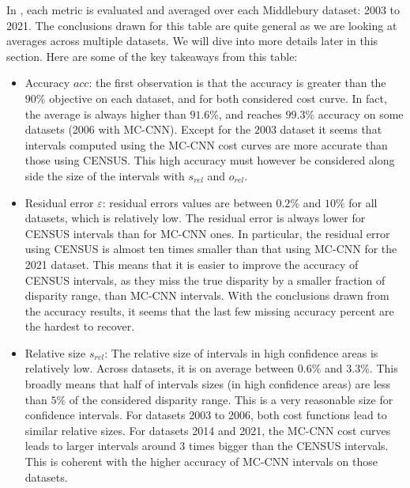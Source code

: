 In , each metric is evaluated and averaged over each Middlebury dataset: 2003 to 2021. The conclusions drawn for this table are quite general as we are looking at averages across multiple datasets. We will dive into more details later in this section. Here are some of the key takeaways from this table:
\begin{itemize}
    \item Accuracy $acc$: the first observation is that the accuracy is greater than the $90\%$ objective on each dataset, and for both considered cost curve. In fact, the average is always higher than $91.6\%$, and reaches $99.3\%$ accuracy on some datasets (2006 with MC-CNN). Except for the $2003$ dataset it seems that intervals computed using the MC-CNN cost curves are more accurate than those using CENSUS. This high accuracy must however be considered along side the size of the intervals with $s_{rel}$ and $o_{rel}$.
    
    \item Residual error $\varepsilon$: residual errors values are between $0.2\%$ and $10\%$ for all datasets, which is relatively low. The residual error is always lower for CENSUS intervals than for MC-CNN ones. In particular, the residual error using CENSUS is almost ten times smaller than that using MC-CNN for the 2021 dataset. This means that it is easier to improve the accuracy of CENSUS intervals, as they miss the true disparity by a smaller fraction of disparity range, than MC-CNN intervals. With the conclusions drawn from the accuracy results, it seems that the last few missing accuracy percent are the hardest to recover.
    
    \item Relative size $s_{rel}$: The relative size of intervals in high confidence areas is relatively low. Across datasets, it is on average between $0.6\%$ and $3.3\%$. This broadly means that half of intervals sizes (in high confidence areas) are less than $5\%$ of the considered disparity range. This is a very reasonable size for confidence intervals. For datasets 2003 to 2006, both cost functions lead to similar relative sizes. For datasets 2014 and 2021, the MC-CNN cost curves leads to larger intervals around 3 times bigger than the CENSUS intervals. This is coherent with the higher accuracy of MC-CNN intervals on those datasets.
    

\end{itemize}
